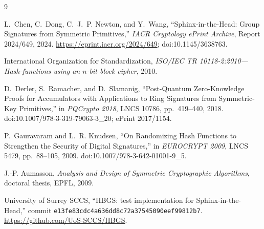 \documentclass[10pt,a4paper]{article}
\begin{document}
\begin{thebibliography}{9}

L.~Chen, C.~Dong, C.~J.~P. Newton, and Y.~Wang,
\newblock ``Sphinx-in-the-Head: Group Signatures from Symmetric Primitives,''
\newblock \emph{IACR Cryptology ePrint Archive}, Report 2024/649, 2024.
\newblock \url{https://eprint.iacr.org/2024/649}; doi:10.1145/3638763.

International Organization for Standardization,
\newblock \emph{ISO/IEC TR 10118-2:2010---Hash-functions using an $n$-bit
block cipher}, 2010.

D.~Derler, S.~Ramacher, and D.~Slamanig,
\newblock ``Post-Quantum Zero-Knowledge Proofs for Accumulators with
Applications to Ring Signatures from Symmetric-Key Primitives,''
\newblock in \emph{PQCrypto 2018}, LNCS 10786, pp.~419--440, 2018.
\newblock doi:10.1007/978-3-319-79063-3\_20; ePrint 2017/1154.

P.~Gauravaram and L.~R. Knudsen,
\newblock ``On Randomizing Hash Functions to Strengthen the Security of
Digital Signatures,''
\newblock in \emph{EUROCRYPT 2009}, LNCS 5479, pp.~88--105, 2009.
\newblock doi:10.1007/978-3-642-01001-9\_5.

J.-P. Aumasson,
\newblock \emph{Analysis and Design of Symmetric Cryptographic Algorithms},
\newblock doctoral thesis, EPFL, 2009.

University of Surrey SCCS,
\newblock ``HBGS: test implementation for Sphinx-in-the-Head,''
\newblock commit \texttt{e13fe83cdc4a636dd8c72a37545090eef99812b7}.
\newblock \url{https://github.com/UoS-SCCS/HBGS}.

\end{thebibliography}
\end{document}
